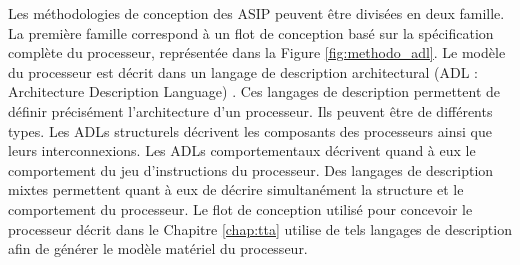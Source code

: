 Les méthodologies de conception des ASIP peuvent être divisées en deux famille. La première famille correspond à un flot de conception basé sur la spécification complète du processeur, représentée dans la Figure \ref{fig:methodo_adl}. Le modèle du processeur est décrit dans un langage de description architectural (ADL : Architecture Description Language) \cite{mishra2011processor}. Ces langages de description permettent de définir précisément l'architecture d'un processeur. Ils peuvent être de différents types. Les ADLs structurels décrivent les composants des processeurs ainsi que leurs interconnexions. Les ADLs comportementaux décrivent quand à eux le comportement du jeu d'instructions du processeur. Des langages de description mixtes permettent quant à eux de décrire simultanément la structure et le comportement du processeur. Le flot de conception utilisé pour concevoir le processeur décrit dans le Chapitre \ref{chap:tta} utilise de tels langages de description afin de générer le modèle matériel du processeur.


